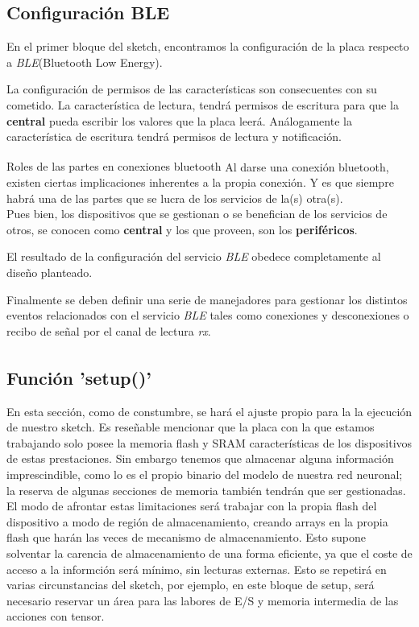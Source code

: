 \subsection{Configuración BLE \textsuperscript{\cite{ladvien}}}
En el primer bloque del sketch, encontramos la configuración de
la placa respecto a \textit{BLE}(Bluetooth Low Energy).

La configuración de permisos de las características son consecuentes con
su cometido. La característica de lectura, tendrá permisos de escritura
para que la \textbf{central} pueda escribir los valores que la placa leerá.
Análogamente la característica de escritura tendrá permisos de lectura y
notificación.


\begin{teoria}{Roles de las partes en conexiones bluetooth\textsuperscript{\cite{BLEOreilly}}}
    \color{mitexto}
    Al darse una conexión bluetooth, existen ciertas implicaciones inherentes
    a la propia conexión. Y es que siempre habrá una de las partes que
    se lucra de los servicios de la(s) otra(s).\\
    Pues bien, los dispositivos que se gestionan o se benefician de los
    servicios de otros, se conocen como \textbf{central} y los que proveen,
    son los \textbf{periféricos}.
\end{teoria}
El resultado de la configuración del servicio \textit{BLE} obedece completamente
al diseño planteado.

Finalmente se deben definir una serie de manejadores para gestionar los
distintos eventos relacionados con el servicio \textit{BLE} tales como
conexiones y desconexiones o recibo de señal por el canal de lectura
\textit{rx}.


\subsection{Función 'setup()'\textsuperscript{\cite{andriyadimw,petewardenmw}}}
En esta sección, como de constumbre, se hará el ajuste propio para la
la ejecución de nuestro sketch.\newline
Es reseñable mencionar que la placa con la que estamos trabajando solo
posee la memoria flash y SRAM características de los dispositivos de estas
prestaciones. Sin embargo tenemos que almacenar alguna información
imprescindible, como lo es el propio binario del modelo de nuestra
red neuronal; la reserva de algunas secciones de memoria también tendrán
que ser gestionadas.\newline
El modo de afrontar estas limitaciones será trabajar con la propia flash
del dispositivo a modo de región de almacenamiento, creando arrays en la
propia flash que harán las veces de mecanismo de almacenamiento. Esto
supone solventar la carencia de almacenamiento de una forma eficiente,
ya que el coste de acceso a la informción será mínimo, sin lecturas
externas.\newline
Esto se repetirá en varias circunstancias del sketch, por ejemplo,
en este bloque de setup, será necesario reservar un área para las labores
de E/S y memoria intermedia de las acciones con tensor.

